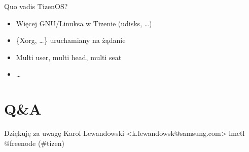 \documentclass[presentation,aspectratio=43,12pt]{beamer}
\begin{document}
\begin{frame}[label=sec-8-1]{Quo vadis TizenOS?}
\begin{itemize}
\item Więcej GNU/Linuksa w Tizenie (udisks, \ldots{})

\item \{Xorg, \ldots{}\} uruchamiany na żądanie

\item Multi user, multi head, multi seat

\item \ldots{}
\end{itemize}
\end{frame}
\section{Q\&A}
\label{sec-9}
\begin{frame}[label=sec-9-1]{Dziękuję za uwagę}
Karol Lewandowski <k.lewandowsk@samsung.com>
lmctl @freenode (\#tizen)
\end{frame}
\end{document}
